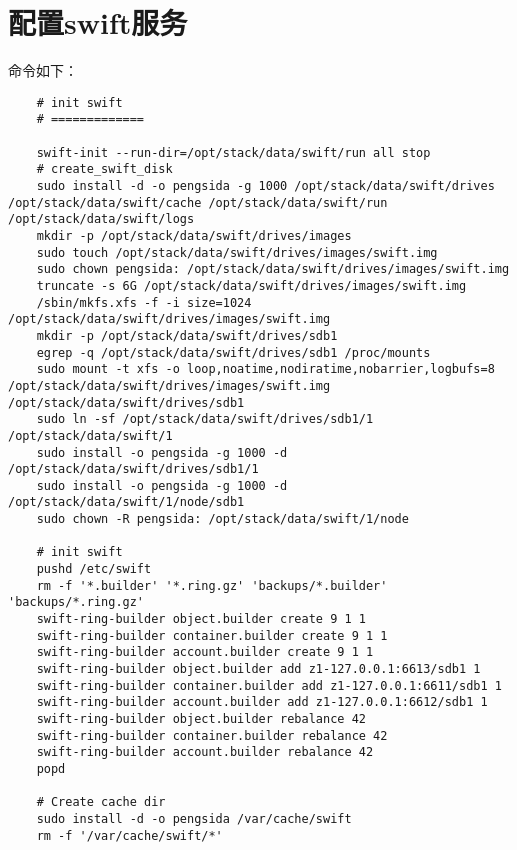 \documentclass[a4paper,left=1.5cm,right=1.5cm,11pt]{article}
\begin{document}
\section{配置swift服务}
	命令如下：
	\begin{lstlisting}
	# init swift
	# =============

	swift-init --run-dir=/opt/stack/data/swift/run all stop
	# create_swift_disk
	sudo install -d -o pengsida -g 1000 /opt/stack/data/swift/drives /opt/stack/data/swift/cache /opt/stack/data/swift/run /opt/stack/data/swift/logs
	mkdir -p /opt/stack/data/swift/drives/images
	sudo touch /opt/stack/data/swift/drives/images/swift.img
	sudo chown pengsida: /opt/stack/data/swift/drives/images/swift.img
	truncate -s 6G /opt/stack/data/swift/drives/images/swift.img
	/sbin/mkfs.xfs -f -i size=1024 /opt/stack/data/swift/drives/images/swift.img
	mkdir -p /opt/stack/data/swift/drives/sdb1
	egrep -q /opt/stack/data/swift/drives/sdb1 /proc/mounts
	sudo mount -t xfs -o loop,noatime,nodiratime,nobarrier,logbufs=8 /opt/stack/data/swift/drives/images/swift.img /opt/stack/data/swift/drives/sdb1
	sudo ln -sf /opt/stack/data/swift/drives/sdb1/1 /opt/stack/data/swift/1
	sudo install -o pengsida -g 1000 -d /opt/stack/data/swift/drives/sdb1/1
	sudo install -o pengsida -g 1000 -d /opt/stack/data/swift/1/node/sdb1
	sudo chown -R pengsida: /opt/stack/data/swift/1/node

	# init swift
	pushd /etc/swift
	rm -f '*.builder' '*.ring.gz' 'backups/*.builder' 'backups/*.ring.gz'
	swift-ring-builder object.builder create 9 1 1
	swift-ring-builder container.builder create 9 1 1
	swift-ring-builder account.builder create 9 1 1
	swift-ring-builder object.builder add z1-127.0.0.1:6613/sdb1 1
	swift-ring-builder container.builder add z1-127.0.0.1:6611/sdb1 1
	swift-ring-builder account.builder add z1-127.0.0.1:6612/sdb1 1
	swift-ring-builder object.builder rebalance 42
	swift-ring-builder container.builder rebalance 42
	swift-ring-builder account.builder rebalance 42
	popd

	# Create cache dir
	sudo install -d -o pengsida /var/cache/swift
	rm -f '/var/cache/swift/*'
	\end{lstlisting}
\end{document}
